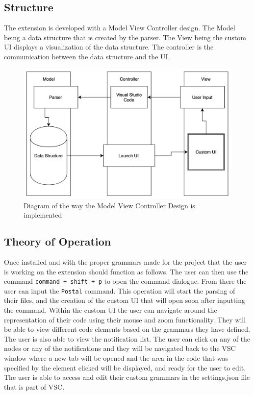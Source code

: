 \documentclass[letterpaper,10pt,titlepage,draftclsnofoot,onecolumn,onesided] {IEEEtran}
\begin{document}
\subsection{Structure}

The extension is developed with a Model View Controller design.
The Model being a data structure that is created by the parser. 
The View being the custom UI displays a visualization of the data structure.
The controller is the communication between the data structure and the UI.

\begin{figure}[H]
	\centering
	\includegraphics[width=.75\textwidth]{MVCsimple}
	\caption{Diagram of the way the Model View Controller Design is implemented}
\end{figure}

\subsection{Theory of Operation}

Once installed and with the proper grammars made for the project that the user is working on the extension should function as follows. 
The user can then use the command \texttt{command + shift + p} to open the command dialogue.
From there the user can input the \texttt{Postal} command. 
This operation will start the parsing of their files, and the creation of the custom UI that will open soon after inputting the command. 
Within the custom UI the user can navigate around the representation of their code using their mouse and zoom functionality.
They will be able to view different code elements based on the grammars they have defined.
The user is also able to view the notification list. 
The user can click on any of the nodes or any of the notifications and they will be navigated back to the VSC window where a new tab will be opened and the area in the code that was specified by the element clicked will be displayed, and ready for the user to edit.
The user is able to access and edit their custom grammars in the settings.json file that is part of VSC. 
\end{document}
